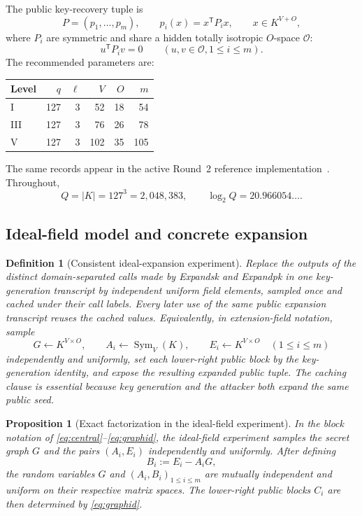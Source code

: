 \documentclass[10pt,a4paper]{article}
\newtheorem{proposition}[theorem]{Proposition}
\newtheorem{definition}[theorem]{Definition}
\newcommand{\cO}{\mathcal O}
\newcommand{\Sym}{\operatorname{Sym}}
\newcommand{\trans}{\mathsf T}
\begin{document}
The public key-recovery tuple is
\[
P=(p_1,\ldots,p_m),\qquad p_i(x)=x^{\trans}P_ix,
\qquad x\in K^{V+O},
\]
where $P_i$ are symmetric and share a hidden totally isotropic $O$-space $\cO$:
\begin{equation}\label{eq:isotropy}
u^{\trans}P_iv=0\qquad(u,v\in\cO,1\le i\le m).
\end{equation}
The recommended parameters are:
\begin{center}
\begin{tabular}{@{}lrrrrr@{}}
\toprule
Level & $q$ & $\ell$ & $V$ & $O$ & $m$\\
\midrule
I&127&3&52&18&54\\
III&127&3&76&26&78\\
V&127&3&102&35&105\\
\bottomrule
\end{tabular}
\end{center}
The same records appear in the active Round~2 reference implementation~\cite{QRUOVRef}. Throughout,
\[
Q=|K|=127^3=2{,}048{,}383,
\qquad \log_2Q=20.966054\ldots.
\]

\subsection{Ideal-field model and concrete expansion}

\begin{definition}[Consistent ideal-expansion experiment]\label{def:ideal}
Replace the outputs of the distinct domain-separated calls made by \textsf{Expandsk} and \textsf{Expandpk} in one key-generation transcript by independent uniform field elements, sampled once and cached under their call labels.  Every later use of the same public expansion transcript reuses the cached values.  Equivalently, in extension-field notation, sample
\[
G\leftarrow K^{V\times O},\qquad
A_i\leftarrow\Sym_V(K),\qquad
E_i\leftarrow K^{V\times O}\quad(1\le i\le m)
\]
independently and uniformly, set each lower-right public block by the key-generation identity, and expose the resulting expanded public tuple.  The caching clause is essential because key generation and the attacker both expand the same public seed.
\end{definition}

\begin{proposition}[Exact factorization in the ideal-field experiment]\label{prop:ideal-factorization}
In the block notation of \eqref{eq:central}--\eqref{eq:graphid}, the ideal-field experiment samples the secret graph $G$ and the pairs $(A_i,E_i)$ independently and uniformly.  After defining
\[
B_i:=E_i-A_iG,
\]
the random variables $G$ and $(A_i,B_i)_{1\le i\le m}$ are mutually independent and uniform on their respective matrix spaces.  The lower-right public blocks $C_i$ are then determined by \eqref{eq:graphid}.
\end{proposition}
\end{document}

